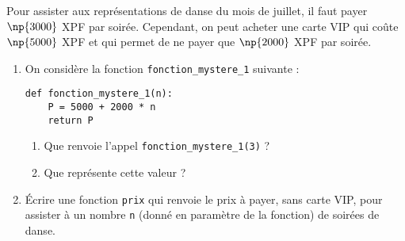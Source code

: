 \documentclass[a4paper,dvipsnames]{article}
\begin{document}
\exo[3 points]\vspace{-2mm} Pour assister aux représentations de danse du mois de juillet, il faut payer $\np{3000}$ XPF par soirée. Cependant, on peut acheter une carte VIP qui coûte $\np{5000}$ XPF et qui permet de ne payer que $\np{2000}$ XPF par soirée.
\begin{enumerate}
  \item On considère la fonction \texttt{fonction_mystere_1} suivante :
    \begin{verbatim}
def fonction_mystere_1(n):
    P = 5000 + 2000 * n
    return P
    \end{verbatim}
   \begin{enumerate}
     \item Que renvoie l'appel \texttt{fonction_mystere_1(3)} ?
     \item Que représente cette valeur ?
   \end{enumerate} 
 \item Écrire une fonction \texttt{prix} qui renvoie le prix à payer, sans carte VIP, pour assister à un nombre \texttt{n} (donné en paramètre de la fonction) de soirées de danse.
\end{enumerate}
\end{document}
